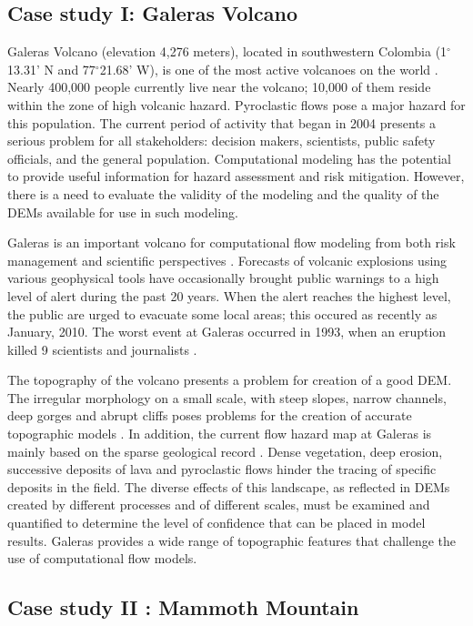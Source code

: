 \documentclass{article}
\newcommand{\Deg}{$^{\circ}$}
\begin{document}
\subsection{Case study I: Galeras Volcano}

Galeras Volcano (elevation 4,276 meters), located in southwestern
Colombia (1\Deg 13.31' N and 77\Deg 21.68' W), is one of the most
active volcanoes on the world \citep{hurtado_1997}. Nearly 400,000
people currently live near the volcano; 10,000 of them reside within
the zone of high volcanic hazard. Pyroclastic flows pose a major
hazard for this population. The current period of activity that began
in 2004 presents a serious problem for all stakeholders: decision
makers, scientists, public safety officials, and the general
population.  Computational modeling has the potential to provide
useful information for hazard assessment and risk mitigation.
However, there is a need to evaluate the validity of the modeling and
the quality of the DEMs available for use in such modeling.

Galeras is an important volcano for computational flow modeling from
both risk management and scientific perspectives
\citep{calvache1997}. Forecasts of volcanic explosions using various
geophysical tools \citep{narvaez_1997} have occasionally brought
public warnings to a high level of alert during the past 20
years. When the alert reaches the highest level, the public are urged
to evacuate some local areas; this occured as recently as January,
2010. The worst event at Galeras occurred in 1993, when an eruption
killed 9 scientists and journalists \citep{baxter1997}.

The topography of the volcano presents a problem for creation of a
good DEM. The irregular morphology on a small scale, with steep
slopes, narrow channels, deep gorges and abrupt cliffs poses problems
for the creation of accurate topographic models
\citep{ordones_2000}. In addition, the current flow hazard map at
Galeras is mainly based on the sparse geological record
\citep{calvache_1990a}. Dense vegetation, deep erosion, successive
deposits of lava and pyroclastic flows hinder the tracing of specific
deposits in the field. The diverse effects of this landscape, as
reflected in DEMs created by different processes and of different
scales, must be examined and quantified to determine the level of
confidence that can be placed in model results. Galeras provides a
wide range of topographic features that challenge the use of
computational flow models.

\subsection{Case study II : Mammoth Mountain}
\end{document}
